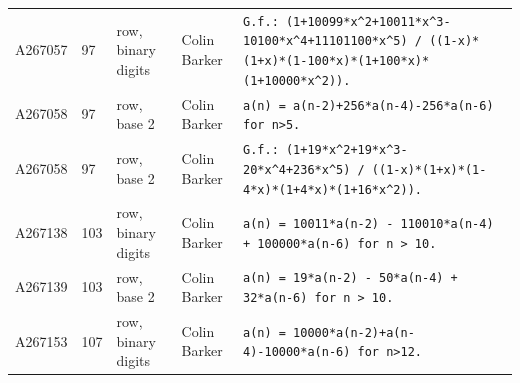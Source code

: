 \documentclass[11pt]{article}
\theoremstyle{definition}
\theoremstyle{remark}
\begin{document}
{\begin{longtable}{p{1.3cm}p{0.7cm}p{2.4cm}p{2.3cm}p{7.3cm}}
A267057 & 97 & row, binary digits & Colin Barker & \texttt{G.f.: \allowbreak{}(1+\allowbreak{}10099*\allowbreak{}x\^{}2+\allowbreak{}10011*\allowbreak{}x\^{}3-\allowbreak{}10100*\allowbreak{}x\^{}4+\allowbreak{}11101100*\allowbreak{}x\^{}5)\allowbreak{} \allowbreak{}/\allowbreak{} \allowbreak{}((1-\allowbreak{}x)\allowbreak{}*\allowbreak{}(1+\allowbreak{}x)\allowbreak{}*\allowbreak{}(1-\allowbreak{}100*\allowbreak{}x)\allowbreak{}*\allowbreak{}(1+\allowbreak{}100*\allowbreak{}x)\allowbreak{}*\allowbreak{}(1+\allowbreak{}10000*\allowbreak{}x\^{}2)\allowbreak{})\allowbreak{}.} \\
A267058 & 97 & row, base 2 & Colin Barker & \texttt{a(n)\allowbreak{} \allowbreak{}=\allowbreak{} \allowbreak{}a(n-\allowbreak{}2)\allowbreak{}+\allowbreak{}256*\allowbreak{}a(n-\allowbreak{}4)\allowbreak{}-\allowbreak{}256*\allowbreak{}a(n-\allowbreak{}6)\allowbreak{} \allowbreak{}for \allowbreak{}n>5.} \\
A267058 & 97 & row, base 2 & Colin Barker & \texttt{G.f.: \allowbreak{}(1+\allowbreak{}19*\allowbreak{}x\^{}2+\allowbreak{}19*\allowbreak{}x\^{}3-\allowbreak{}20*\allowbreak{}x\^{}4+\allowbreak{}236*\allowbreak{}x\^{}5)\allowbreak{} \allowbreak{}/\allowbreak{} \allowbreak{}((1-\allowbreak{}x)\allowbreak{}*\allowbreak{}(1+\allowbreak{}x)\allowbreak{}*\allowbreak{}(1-\allowbreak{}4*\allowbreak{}x)\allowbreak{}*\allowbreak{}(1+\allowbreak{}4*\allowbreak{}x)\allowbreak{}*\allowbreak{}(1+\allowbreak{}16*\allowbreak{}x\^{}2)\allowbreak{})\allowbreak{}.} \\
A267138 & 103 & row, binary digits & Colin Barker & \texttt{a(n)\allowbreak{} \allowbreak{}=\allowbreak{} \allowbreak{}10011*\allowbreak{}a(n-\allowbreak{}2)\allowbreak{} \allowbreak{}-\allowbreak{} \allowbreak{}110010*\allowbreak{}a(n-\allowbreak{}4)\allowbreak{} \allowbreak{}+\allowbreak{} \allowbreak{}100000*\allowbreak{}a(n-\allowbreak{}6)\allowbreak{} \allowbreak{}for \allowbreak{}n \allowbreak{}> \allowbreak{}10.} \\
A267139 & 103 & row, base 2 & Colin Barker & \texttt{a(n)\allowbreak{} \allowbreak{}=\allowbreak{} \allowbreak{}19*\allowbreak{}a(n-\allowbreak{}2)\allowbreak{} \allowbreak{}-\allowbreak{} \allowbreak{}50*\allowbreak{}a(n-\allowbreak{}4)\allowbreak{} \allowbreak{}+\allowbreak{} \allowbreak{}32*\allowbreak{}a(n-\allowbreak{}6)\allowbreak{} \allowbreak{}for \allowbreak{}n \allowbreak{}> \allowbreak{}10.} \\
A267153 & 107 & row, binary digits & Colin Barker & \texttt{a(n)\allowbreak{} \allowbreak{}=\allowbreak{} \allowbreak{}10000*\allowbreak{}a(n-\allowbreak{}2)\allowbreak{}+\allowbreak{}a(n-\allowbreak{}4)\allowbreak{}-\allowbreak{}10000*\allowbreak{}a(n-\allowbreak{}6)\allowbreak{} \allowbreak{}for \allowbreak{}n>12.} \\

\end{longtable}}
\end{document}
